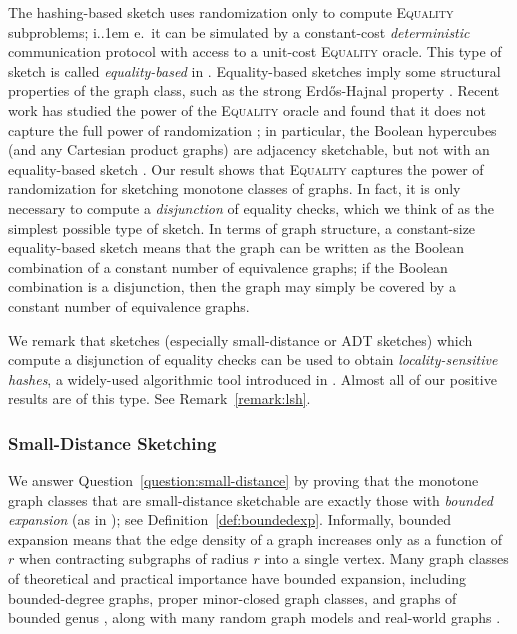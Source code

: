 \documentclass[11pt]{article}
\newcommand*\ie{i.\kern.1em e.\ }
\theoremstyle{definition}
\begin{document}
The hashing-based sketch uses randomization only to compute \textsc{Equality} subproblems; \ie it
can be simulated by a constant-cost \emph{deterministic} communication protocol with access to a
unit-cost \textsc{Equality} oracle.  This type of sketch is called \emph{equality-based} in
\cite{HWZ21}.  Equality-based sketches imply some structural properties of the graph class, such as
the strong Erd{\H o}s-Hajnal property \cite{HHH21b}. Recent work has studied the power of the
\textsc{Equality} oracle and found that it does not capture the full power of randomization
\cite{CLV19,HHH21b,HWZ21}; in particular, the Boolean hypercubes (and any Cartesian product graphs)
are adjacency sketchable, but not with an equality-based sketch \cite{HHH21b,HWZ21}.  Our result
shows that \textsc{Equality} captures the power of randomization for sketching monotone classes of
graphs. In fact, it is only necessary to compute a \emph{disjunction} of equality checks, which we
think of as the simplest possible type of sketch. In terms of graph structure, a constant-size
equality-based sketch means that the graph can be written as the Boolean combination of a constant
number of equivalence graphs; if the Boolean combination is a disjunction, then the graph may simply
be covered by a constant number of equivalence graphs.

We remark that sketches (especially small-distance or ADT sketches) which compute a disjunction of
equality checks can be used to obtain \emph{locality-sensitive hashes}, a widely-used algorithmic
tool introduced in \cite{IM98}. Almost all of our positive results are of this type. See
Remark~\ref{remark:lsh}.

\subsubsection{Small-Distance Sketching}
We answer Question~\ref{question:small-distance} by proving that the monotone graph classes that are
small-distance sketchable are exactly those with \emph{bounded expansion} (as in \cite{NO12}); see 
Definition~\ref{def:boundedexp}. Informally, bounded expansion means that the edge density of a
graph increases only as a function of $r$ when contracting subgraphs of radius $r$ into a single
vertex. Many graph classes of theoretical and practical importance have bounded expansion, including
bounded-degree graphs, proper minor-closed graph classes, and graphs of bounded genus \cite{NO12},
along with many random graph models and real-world graphs \cite{DRR+14}.
\end{document}
